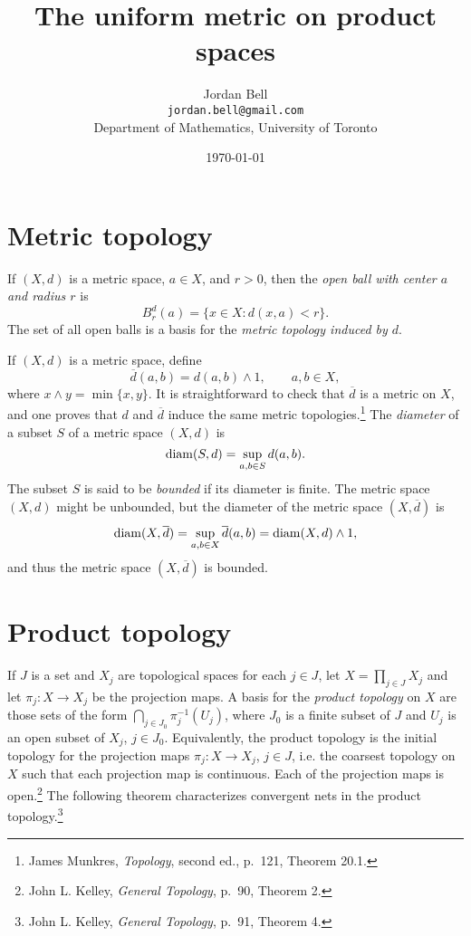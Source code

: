 \documentclass{article}
\newcommand{\diam}{\ensuremath\mathrm{diam}}
\theoremstyle{definition}
\begin{document}
\title{The uniform metric on product spaces}
\author{Jordan Bell\\ \texttt{jordan.bell@gmail.com}\\Department of Mathematics, University of Toronto}
\date{\today}

\maketitle

\section{Metric topology}
If $(X,d)$ is a metric space, $a \in X$, and $r>0$, then the {\em open ball with center $a$ and radius $r$} is 
\[
B_r^d(a)=\{x \in X: d(x,a)<r\}.
\]
The set of all open balls is a basis for 
the {\em metric topology induced by $d$}.

If $(X,d)$ is a metric space,  define
\[
\overline{d}(a,b)=d(a,b) \wedge 1, \qquad a,b \in X,
\]
where $x \wedge y = \min\{x,y\}$.
It is straightforward to check that $\overline{d}$ is a metric on $X$, and one proves that $d$ and $\overline{d}$ induce the same metric
topologies.\footnote{James Munkres, {\em Topology}, second ed., p.~121, Theorem 20.1.}
The {\em diameter} of a subset $S$ of a metric space $(X,d)$ is
\[
\diam (S,d)=\sup_{a,b \in S} d(a,b).
\]
The subset $S$ is said to be {\em bounded} if its diameter is finite. 
The metric space $(X,d)$ might  be unbounded, but the diameter of the metric space
$(X,\overline{d})$ is 
\[
\diam(X,\overline{d})= \sup_{a,b \in X} \overline{d}(a,b)= \diam(X,d) \wedge 1,
\]
and thus the metric space $(X,\overline{d})$ is bounded.

\section{Product topology}
If $J$ is a set and $X_j$ are topological spaces for each $j \in J$, let $X=\prod_{j \in J} X_j$ and let $\pi_j:X \to X_j$ be the projection maps.
A basis for the {\em product topology} on $X$ are those sets of the form $\bigcap_{j \in J_0} \pi_j^{-1}(U_j)$, where $J_0$ is a finite subset
of $J$ and $U_j$ is an open subset of $X_j$, $j \in J_0$.
Equivalently, the product topology is the initial topology for the projection maps $\pi_j:X \to X_j$, $j \in J$, i.e. the coarsest topology on $X$ such that
each projection map is continuous. Each of the projection maps is open.\footnote{John L. Kelley, {\em General Topology},
p.~90, Theorem 2.}  The following theorem characterizes convergent nets in the product topology.\footnote{John L. Kelley, {\em General Topology}, p.~91, Theorem 4.}
\end{document}
